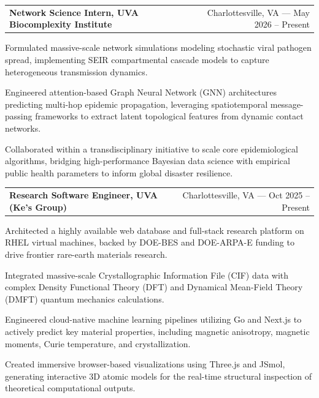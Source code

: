 \documentclass[letterpaper,10pt]{article}
\makeatletter
\newcommand{\resumeItemListStart}{
  \vspace{-4pt}
  \begin{list}{\textbullet}{
    \setlength{\leftmargin}{0.15in}
    \setlength{\labelwidth}{0.15in}
    \setlength{\labelsep}{0.05in}
    \setlength{\itemsep}{0pt} 
    \setlength{\parsep}{0pt}
    \setlength{\topsep}{0pt}
    \setlength{\partopsep}{0pt}
}}
\newcommand{\resumeItemListEnd}{\end{list}\vspace{-1pt}}
\newcommand{\resumeItem}[1]{\item\small{#1}}
\newcommand{\resumeHeading}[2]{
  \item[]
    \begin{tabular*}{\linewidth}[t]{@{}l@{\extracolsep{\fill}}r@{}}
      #1 & #2 \\
    \end{tabular*}\vspace{-2pt} 
}
\makeatother
\begin{document}
    \vspace{4pt}

    \resumeHeading{\textbf{Network Science Intern, UVA Biocomplexity Institute}}{Charlottesville, VA --- May 2026 -- Present}
      \resumeItemListStart
        \resumeItem{Formulated massive-scale network simulations modeling stochastic viral pathogen spread, implementing SEIR compartmental cascade models to capture heterogeneous transmission dynamics.}
        \resumeItem{Engineered attention-based Graph Neural Network (GNN) architectures predicting multi-hop epidemic propagation, leveraging spatiotemporal message-passing frameworks to extract latent topological features from dynamic contact networks.}
        \resumeItem{Collaborated within a transdisciplinary initiative to scale core epidemiological algorithms, bridging high-performance Bayesian data science with empirical public health parameters to inform global disaster resilience.}
      \resumeItemListEnd

    \vspace{4pt}

    \resumeHeading{\textbf{Research Software Engineer, UVA (Ke's Group)}}{Charlottesville, VA --- Oct 2025 -- Present}
      \resumeItemListStart
        \resumeItem{Architected a highly available web database and full-stack research platform on RHEL virtual machines, backed by DOE-BES and DOE-ARPA-E funding to drive frontier rare-earth materials research.}
        \resumeItem{Integrated massive-scale Crystallographic Information File (CIF) data with complex Density Functional Theory (DFT) and Dynamical Mean-Field Theory (DMFT) quantum mechanics calculations.}
        \resumeItem{Engineered cloud-native machine learning pipelines utilizing Go and Next.js to actively predict key material properties, including magnetic anisotropy, magnetic moments, Curie temperature, and crystallization.}
        \resumeItem{Created immersive browser-based visualizations using Three.js and JSmol, generating interactive 3D atomic models for the real-time structural inspection of theoretical computational outputs.}
      \resumeItemListEnd

    \vspace{4pt}
\end{document}
